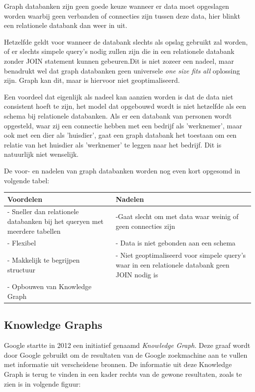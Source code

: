 Graph databanken zijn geen goede keuze wanneer er data moet opgeslagen worden waarbij geen verbanden of connecties zijn tussen deze data, hier blinkt een relationele databank dan weer in uit. 

Hetzelfde geldt voor wanneer de databank slechts als opslag gebruikt zal worden, of er slechts simpele query's nodig zullen zijn die in een relationele databank zonder JOIN statement kunnen gebeuren.Dit is niet zozeer een nadeel, maar benadrukt wel dat graph databanken geen universele \textit{one size fits all} oplossing zijn. Graph kan dit, maar is hiervoor niet geoptimaliseerd.

Een voordeel dat eigenlijk als nadeel kan aanzien worden is dat de data niet consistent hoeft te zijn, het model dat opgebouwd wordt is niet hetzelfde als een schema bij relationele databanken. Als er een databank van personen wordt opgesteld, waar zij een connectie hebben met een bedrijf als 'werknemer', maar ook met een dier als 'huisdier', gaat een graph databank het toestaan om een relatie van het huisdier als 'werknemer' te leggen naar het bedrijf. Dit is natuurlijk niet wenselijk.

De voor- en nadelen van graph databanken worden nog even kort opgesomd in volgende tabel:

\begin{center}
	\begin{tabularx}{\textwidth}{|X|X|}
		\hline
		\textbf{Voordelen} & \textbf{Nadelen}  \\ 
		\hline
		 - Sneller dan relationele databanken bij het queryen met meerdere tabellen & -Gaat slecht om met data waar weinig of geen connecties zijn \\ 
		- Flexibel & - Data is niet gebonden aan een schema \\
		- Makkelijk te begrijpen structuur & - Niet geoptimaliseerd voor simpele query's waar in een relationele databank geen JOIN nodig is \\ 
		- Opbouwen van Knowledge Graph & \\
		\hline
	\end{tabularx}
\end{center}

\subsection{Knowledge Graphs}
\label{sec:Knowledge Graphs}

Google startte in 2012 een initiatief genaamd \textit{Knowledge Graph}. Deze graaf wordt door Google gebruikt om de resultaten van de Google zoekmachine aan te vullen met informatie uit verscheidene bronnen. De informatie uit deze Knowledge Graph is terug te vinden in een kader rechts van de gewone resultaten, zoals te zien is in volgende figuur: 

